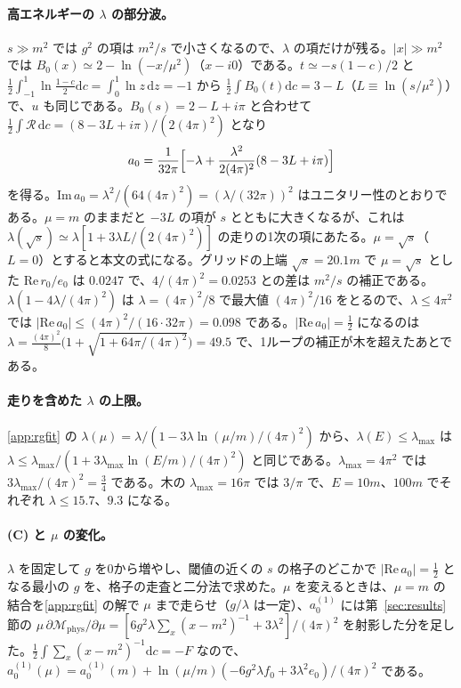 \documentclass[a4paper,10pt]{ltjsarticle}
\newcommand{\dd}{\mathrm{d}}
\begin{document}
\paragraph{高エネルギーの $\lambda$ の部分波。}$s\gg m^2$ では $g^2$ の項は $m^2/s$ で小さくなるので、$\lambda$ の項だけが残る。$|x|\gg m^2$ では $B_0(x)\simeq2-\ln(-x/\mu^2)$（$x-i0$）である。$t\simeq-s(1-c)/2$ と $\frac12\int_{-1}^1\ln\frac{1-c}{2}\dd c=\int_0^1\ln z\,\dd z=-1$ から $\frac12\int B_0(t)\dd c=3-L$（$L\equiv\ln(s/\mu^2)$）で、$u$ も同じである。$B_0(s)=2-L+i\pi$ と合わせて $\frac12\int\mathcal{R}\,\dd c=(8-3L+i\pi)/(2(4\pi)^2)$ となり
\begin{equation*}
a_0=\frac{1}{32\pi}\Bigl[-\lambda+\frac{\lambda^2}{2(4\pi)^2}(8-3L+i\pi)\Bigr]
\end{equation*}
を得る。$\mathrm{Im}\,a_0=\lambda^2/(64(4\pi)^2)=(\lambda/(32\pi))^2$ はユニタリー性のとおりである。$\mu=m$ のままだと $-3L$ の項が $s$ とともに大きくなるが、これは $\lambda(\sqrt s)\simeq\lambda[1+3\lambda L/(2(4\pi)^2)]$ の走りの1次の項にあたる。$\mu=\sqrt s$（$L=0$）とすると本文の式になる。グリッドの上端 $\sqrt s=20.1m$ で $\mu=\sqrt s$ とした $\mathrm{Re}\,r_0/e_0$ は $0.0247$ で、$4/(4\pi)^2=0.0253$ との差は $m^2/s$ の補正である。$\lambda(1-4\lambda/(4\pi)^2)$ は $\lambda=(4\pi)^2/8$ で最大値 $(4\pi)^2/16$ をとるので、$\lambda\le4\pi^2$ では $|\mathrm{Re}\,a_0|\le(4\pi)^2/(16\cdot32\pi)=0.098$ である。$|\mathrm{Re}\,a_0|=\frac12$ になるのは $\lambda=\frac{(4\pi)^2}{8}\bigl(1+\sqrt{1+64\pi/(4\pi)^2}\bigr)=49.5$ で、1ループの補正が木を超えたあとである。

\paragraph{走りを含めた $\lambda$ の上限。}\ref{app:rgfit} の $\lambda(\mu)=\lambda/(1-3\lambda\ln(\mu/m)/(4\pi)^2)$ から、$\lambda(E)\le\lambda_{\max}$ は $\lambda\le\lambda_{\max}/(1+3\lambda_{\max}\ln(E/m)/(4\pi)^2)$ と同じである。$\lambda_{\max}=4\pi^2$ では $3\lambda_{\max}/(4\pi)^2=\frac34$ である。木の $\lambda_{\max}=16\pi$ では $3/\pi$ で、$E=10m$、$100m$ でそれぞれ $\lambda\le15.7$、$9.3$ になる。

\paragraph{(C) と $\mu$ の変化。}$\lambda$ を固定して $g$ を0から増やし、閾値の近くの $s$ の格子のどこかで $|\mathrm{Re}\,a_0|=\frac12$ となる最小の $g$ を、格子の走査と二分法で求めた。$\mu$ を変えるときは、$\mu=m$ の結合を\ref{app:rgfit} の解で $\mu$ まで走らせ（$g/\lambda$ は一定）、$a_0^{(1)}$ には第~\ref{sec:results} 節の $\mu\,\partial\mathcal{M}_{\mathrm{phys}}/\partial\mu=[6g^2\lambda\sum_x(x-m^2)^{-1}+3\lambda^2]/(4\pi)^2$ を射影した分を足した。$\frac12\int\sum_x(x-m^2)^{-1}\dd c=-F$ なので、$a_0^{(1)}(\mu)=a_0^{(1)}(m)+\ln(\mu/m)(-6g^2\lambda f_0+3\lambda^2e_0)/(4\pi)^2$ である。
\end{document}
